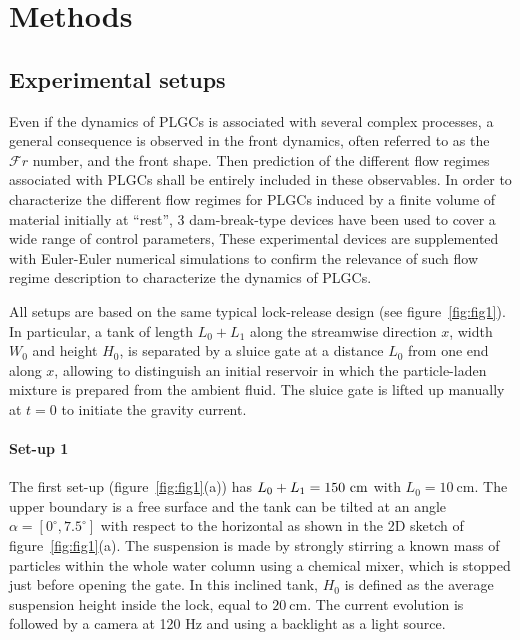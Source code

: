 \documentclass[twocolumn]{article}
\begin{document}
\section{Methods}

\subsection{Experimental setups}
Even if the dynamics of PLGCs is associated with several complex processes, a general consequence is observed in the front dynamics, often referred to as the $\mathcal{F}r$ number, and the front shape. Then prediction of the different flow regimes associated with PLGCs shall be entirely included in these observables. In order to characterize the different flow regimes for PLGCs induced by a finite volume of material initially at ``rest'', 3 dam-break-type devices have been used to cover a wide range of control parameters, These experimental devices are supplemented with Euler-Euler numerical simulations to confirm the relevance of such flow regime description to characterize the dynamics of PLGCs.

All setups are based on the same typical lock-release design (see figure~\ref{fig:fig1}). In particular, a tank of length $L_0+L_1$ along the streamwise direction $x$, width $W_0$ and height $H_0$, is separated by a sluice gate at a distance $L_0$ from one end along $x$, allowing to distinguish an initial reservoir in which the particle-laden mixture is prepared from the ambient fluid. The sluice gate is lifted up manually at $t=0$ to initiate the gravity current.

\paragraph{Set-up 1}

The first set-up (figure~\ref{fig:fig1}(a)) has $L_0+L_1=150~\textup{cm}$ with $L_0 = 10~\textrm{cm}$. The upper boundary is a free surface and the tank can be tilted at an angle $\alpha=[0^\circ,7.5^\circ]$ with respect to the horizontal as shown in the 2D sketch of figure~\ref{fig:fig1}(a). The suspension is made by strongly stirring a known mass of particles within the whole water column using a chemical mixer, which is stopped just before opening the gate. In this inclined tank, $H_{0}$ is defined as the average suspension height inside the lock, equal to $20~\textrm{cm}$.
%
The current evolution is followed by a camera at 120 Hz and using a backlight as a light source.
\end{document}
